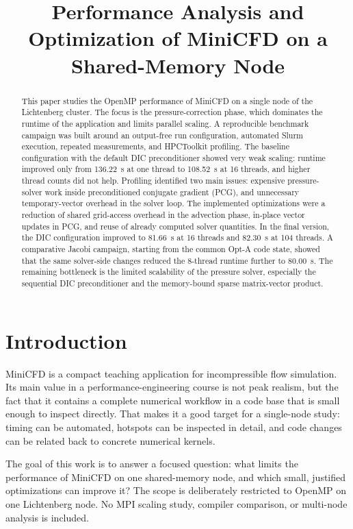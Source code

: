 \documentclass[10pt,firstlineindent,nopartpage,article,accentcolor=tud1b]{tudreport}
\title{Performance Analysis and Optimization of MiniCFD on a Shared-Memory Node}
\begin{document}
\maketitle

\begin{abstract}
This paper studies the OpenMP performance of MiniCFD on a single node of the
Lichtenberg cluster. The focus is the pressure-correction phase, which dominates
the runtime of the application and limits parallel scaling. A reproducible
benchmark campaign was built around an output-free run configuration, automated
Slurm execution, repeated measurements, and HPCToolkit profiling. The baseline
configuration with the default DIC preconditioner showed very weak scaling:
runtime improved only from \SI{136.22}{s} at one thread to \SI{108.52}{s} at
16 threads, and higher thread counts did not help. Profiling identified two
main issues: expensive pressure-solver work inside preconditioned conjugate
gradient (PCG), and unnecessary temporary-vector overhead in the solver loop.
The implemented optimizations were a reduction of shared grid-access overhead in
the advection phase, in-place vector updates in PCG, and reuse of already
computed solver quantities. In the final version, the DIC configuration
improved to \SI{81.66}{s} at 16 threads and \SI{82.30}{s} at 104 threads. A
comparative Jacobi campaign, starting from the common Opt-A code state, showed
that the same solver-side changes reduced the 8-thread runtime further to
\SI{80.00}{s}. The remaining bottleneck is the limited scalability of the
pressure solver, especially the sequential DIC preconditioner and the
memory-bound sparse matrix-vector product.
\end{abstract}

\section{Introduction}
MiniCFD is a compact teaching application for incompressible flow simulation.
Its main value in a performance-engineering course is not peak realism, but the
fact that it contains a complete numerical workflow in a code base that is
small enough to inspect directly. That makes it a good target for a
single-node study: timing can be automated, hotspots can be inspected in
detail, and code changes can be related back to concrete numerical kernels.

The goal of this work is to answer a focused question: what limits the
performance of MiniCFD on one shared-memory node, and which small, justified
optimizations can improve it? The scope is deliberately restricted to OpenMP on
one Lichtenberg node. No MPI scaling study, compiler comparison, or multi-node
analysis is included.
\end{document}
